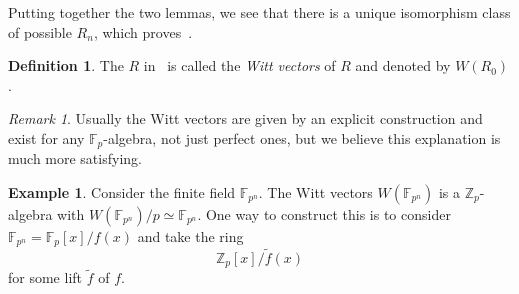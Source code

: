 \documentclass[10pt]{amsart}
\theoremstyle{definition}
\newtheorem{defn}[thm]{Definition}
\newtheorem{exm}[thm]{Example}
\theoremstyle{remark}
\newtheorem{rmk}[thm]{Remark}
\theoremstyle{plain}
\theoremstyle{definition}
\theoremstyle{remark}
\newcommand{\Z}{\mathbb{Z}}
\newcommand{\F}{\mathbb{F}}
\newcommand{\1}{\mathbf{1}}
\newcommand{\2}{\mathbf{2}}
\newcommand{\3}{\mathbf{3}}
\begin{document}
Putting together the two lemmas, we see that there is a unique isomorphism class of possible $R_n$, which proves~.

\begin{defn}
    The $R$ in~ is called the \textit{Witt vectors} of $R$ and denoted by $W(R_0)$.
\end{defn}

\begin{rmk}
    Usually the Witt vectors are given by an explicit construction and exist for any $\F_p$-algebra, not just perfect ones, but we believe this explanation is much more satisfying.
\end{rmk}

\begin{exm}
    Consider the finite field $\F_{p^n}$. The Witt vectors $W(\F_{p^n})$
    is a $\Z_p$-algebra with $W(\F_{p^n}) / p \simeq \F_{p^n}$. One way to construct this is to consider $\F_{p^n} = \F_p[x]/f(x)$ and take the ring
    \[ \Z_p[x]/\tilde{f}(x) \]
    for some lift $\tilde{f}$ of $f$.
\end{exm}
\end{document}
